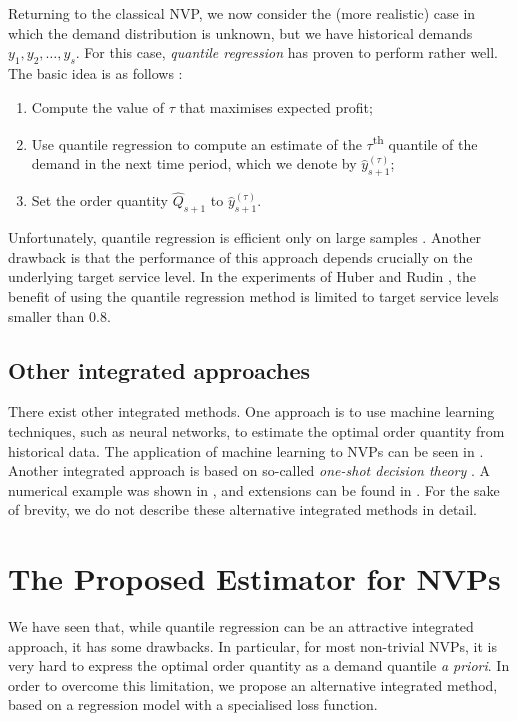 \documentclass{article}
\begin{document}
Returning to the classical NVP, we now consider the (more realistic) case in which the demand distribution is unknown, but we have historical demands $y_1,y_2,\dots,y_s$.
For this case, \emph{quantile regression}
has proven to perform rather well. The basic idea is as follows \cite{BT06,Br16,CS19,HNS15,Hu19}:
\begin{enumerate}
\item Compute the value of $\tau$ that maximises expected profit;
\item Use quantile regression to compute an estimate of the $\tau$\textsuperscript{th} quantile of the demand in the next time period, which we denote by $\hat{y}_{s+1}^{(\tau)}$;
\item Set the order quantity $\hat{Q}_{s+1}$ to $\hat{y}_{s+1}^{(\tau)}$.
\end{enumerate}

Unfortunately, quantile regression is efficient only on large samples \cite{Hu19,RV19}. Another drawback is that the performance of this approach depends crucially on the underlying target service level. In the experiments of Huber \cite{Hu19} and Rudin \cite{RV19}, the benefit of using the quantile regression method is limited to target service levels smaller than 0.8.

\subsection{Other integrated approaches} %

There exist other integrated methods. One approach is to use machine learning techniques, such as neural networks, to estimate the optimal order quantity from historical data. The application of machine learning to NVPs can be seen in \cite{CS19,OST20,RV19}. Another integrated approach is based on so-called \emph{one-shot decision theory} \cite{Guo11,GM14,Ma19}. A numerical example was shown in \cite{Guo11}, and extensions can be found in \cite{Ma19}. For the sake of brevity, we do not describe these alternative integrated methods in detail.

\section{The Proposed Estimator for NVPs} \label{se:new}

We have seen that, while quantile regression can be an attractive integrated approach, it has some drawbacks. In particular, for most non-trivial NVPs, it is very hard to express the optimal order quantity as a demand quantile \emph{a priori}. In order to overcome this limitation, we propose an alternative integrated method, based on a regression model with a specialised loss function.
\end{document}
